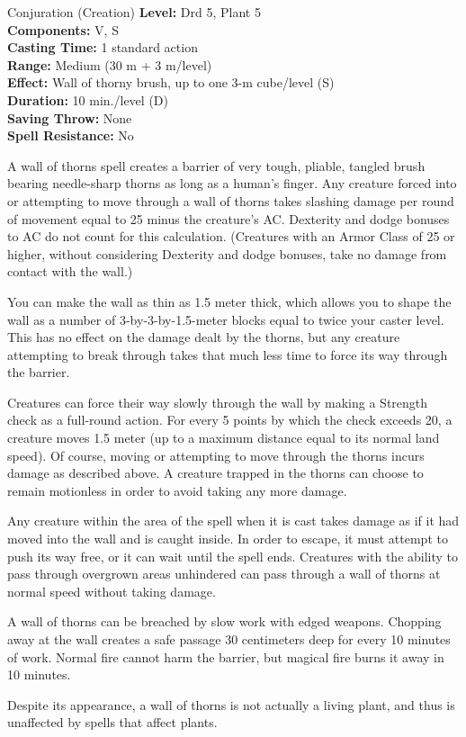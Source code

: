 {Conjuration (Creation)}
{
	\textbf{Level:}
	Drd 5, Plant 5\\
	\textbf{Components:}
	V, S\\
	\textbf{Casting Time:}
	1 standard action\\
	\textbf{Range:}
	Medium (30 m + 3 m/level)\\
	\textbf{Effect:}
	Wall of thorny brush, up to one 3-m cube/level (S)\\
	\textbf{Duration:}
	10 min./level (D)\\
	\textbf{Saving Throw:}
	None\\
	\textbf{Spell Resistance:}
	No\\
}
{
	A wall of thorns spell creates a barrier of very tough, pliable, tangled brush bearing needle-sharp thorns as long as a human's finger. Any creature forced into or attempting to move through a wall of thorns takes slashing damage per round of movement equal to 25 minus the creature's AC. Dexterity and dodge bonuses to AC do not count for this calculation. (Creatures with an Armor Class of 25 or higher, without considering Dexterity and dodge bonuses, take no damage from contact with the wall.)

	You can make the wall as thin as 1.5 meter thick, which allows you to shape the wall as a number of 3-by-3-by-1.5-meter blocks equal to twice your caster level. This has no effect on the damage dealt by the thorns, but any creature attempting to break through takes that much less time to force its way through the barrier.

	Creatures can force their way slowly through the wall by making a Strength check as a full-round action. For every 5 points by which the check exceeds 20, a creature moves 1.5 meter (up to a maximum distance equal to its normal land speed). Of course, moving or attempting to move through the thorns incurs damage as described above. A creature trapped in the thorns can choose to remain motionless in order to avoid taking any more damage.

	Any creature within the area of the spell when it is cast takes damage as if it had moved into the wall and is caught inside. In order to escape, it must attempt to push its way free, or it can wait until the spell ends. Creatures with the ability to pass through overgrown areas unhindered can pass through a wall of thorns at normal speed without taking damage.

	A wall of thorns can be breached by slow work with edged weapons. Chopping away at the wall creates a safe passage 30 centimeters deep for every 10 minutes of work. Normal fire cannot harm the barrier, but magical fire burns it away in 10 minutes.

	Despite its appearance, a wall of thorns is not actually a living plant, and thus is unaffected by spells that affect plants.

}
